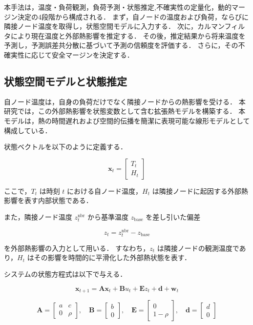 \documentclass[techrep]{ipsj}
\begin{document}
本手法は，温度・負荷観測，負荷予測・状態推定,不確実性の定量化，動的マージン決定の4段階から構成される．
まず，自ノードの温度および負荷，ならびに隣接ノード温度を取得し，状態空間モデルに入力する．
次に，カルマンフィルタにより現在温度と外部熱影響を推定する．
その後，推定結果から将来温度を予測し，予測誤差共分散に基づいて予測の信頼度を評価する．
さらに，その不確実性に応じて安全マージンを決定する．

\subsection{状態空間モデルと状態推定}

自ノード温度は，自身の負荷だけでなく隣接ノードからの熱影響を受ける．
本研究では，この外部熱影響を状態変数として含む拡張熱モデルを構築する．
本モデルは，熱の時間遅れおよび空間的伝播を簡潔に表現可能な線形モデルとして構成している．

状態ベクトルを以下のように定義する．

\begin{equation}
\mathbf{x}_t =
\begin{bmatrix}
T_t \\
H_t
\end{bmatrix}
\end{equation}

ここで，$T_t$ は時刻 $t$ における自ノード温度，$H_t$ は隣接ノードに起因する外部熱影響を表す内部状態である．

また，隣接ノード温度 $z_t^{\mathrm{nbr}}$ から基準温度 $z_{\mathrm{base}}$ を差し引いた偏差

\begin{equation}
z_t = z_t^{\mathrm{nbr}} - z_{\mathrm{base}}
\end{equation}

を外部熱影響の入力として用いる．
すなわち，$z_t$ は隣接ノードの観測温度であり，$H_t$ はその影響を時間的に平滑化した外部熱状態を表す．

システムの状態方程式は以下で与える．

\begin{equation}
\mathbf{x}_{t+1}
=
\mathbf{A}\mathbf{x}_t
+
\mathbf{B}u_t
+
\mathbf{E}z_t
+
\mathbf{d}
+
\mathbf{w}_t
\end{equation}

\begin{equation}
\mathbf{A}
=
\begin{bmatrix}
a & c \\
0 & \rho
\end{bmatrix},
\quad
\mathbf{B}
=
\begin{bmatrix}
b \\
0
\end{bmatrix},
\quad
\mathbf{E}
=
\begin{bmatrix}
0 \\
1-\rho
\end{bmatrix},
\quad
\mathbf{d}
=
\begin{bmatrix}
d \\
0
\end{bmatrix}
\end{equation}
\end{document}
